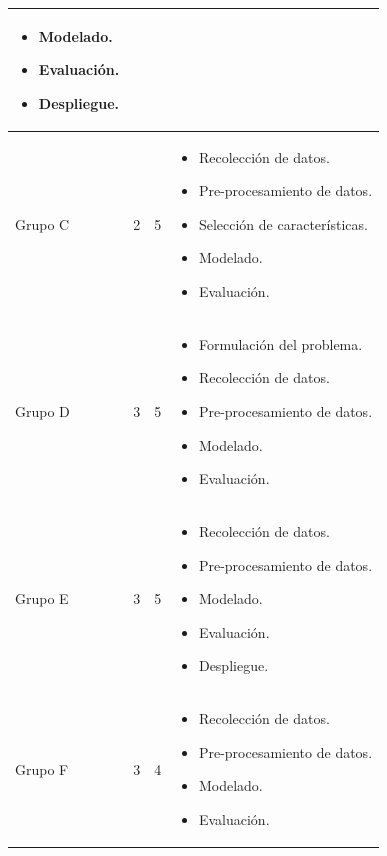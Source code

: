 \begin{longtable}{M{3cm}M{2.5cm}M{2.5cm}M{6cm}}
\begin{itemize}[label={--},nosep,noitemsep,leftmargin=*,topsep=0pt,partopsep=0pt]
			\item Modelado.
			\item Evaluación.
			\item Despliegue.
		\end{itemize} 
		\\
		\hline
		{Grupo C}
		& 2
		& 5
		& 
		\begin{itemize}[label={--},nosep,noitemsep,leftmargin=*,topsep=0pt,partopsep=0pt]
			\item Recolección de datos.
			\item Pre-procesamiento de datos.
			\item Selección de características.
			\item Modelado.
			\item Evaluación.
		\end{itemize} 
		\\
		\hline
		{Grupo D}
		& 3
		& 5
		& 
		\begin{itemize}[label={--},nosep,noitemsep,leftmargin=*,topsep=0pt,partopsep=0pt]
			\item Formulación del problema.
			\item Recolección de datos.
			\item Pre-procesamiento de datos.
			\item Modelado.
			\item Evaluación.
		\end{itemize} 
		\\
		\hline
		{Grupo E}
		& 3
		& 5
		& 
		\begin{itemize}[label={--},nosep,noitemsep,leftmargin=*,topsep=0pt,partopsep=0pt]
			\item Recolección de datos.
			\item Pre-procesamiento de datos.
			\item Modelado.
			\item Evaluación.
			\item Despliegue.
		\end{itemize} 
		\\
		\hline
		{Grupo F}
		& 3
		& 4
		& 
		\begin{itemize}[label={--},nosep,noitemsep,leftmargin=*,topsep=0pt,partopsep=0pt]
			\item Recolección de datos.
			\item Pre-procesamiento de datos.
			\item Modelado.
			\item Evaluación.

\end{itemize}
\end{longtable}
